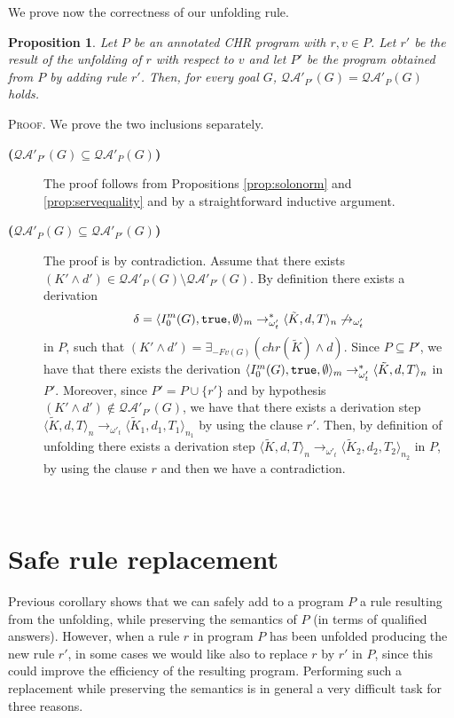 \documentclass[final]{acmtrans2e}
\newtheorem{proposition}[theorem]{Proposition}
\begin{document}
We prove now the correctness of our unfolding rule.

\begin{proposition}\label{lemma:equality}
Let $P$ be an annotated CHR program with $r, v\in P$. Let $r'$  be the result
of the unfolding of $r$ with respect to $v$ and let $P'$ be the program
obtained from $P$ by adding rule $r'$. Then, for every goal $G$,
$\mathcal{QA'}_{P'}(G) = \mathcal{QA'}_P(G)$ holds.
\end{proposition}


\textsc{Proof.}
We prove the two inclusions separately.
\begin{description}
  \item[{\bf ($\mathcal{QA'}_{P'}(G) \subseteq \mathcal{QA'}_P(G)$)}] The proof follows from Propositions \ref{prop:solonorm} and \ref{prop:servequality} and by a straightforward inductive argument.
  \item[{\bf ($\mathcal{QA'}_{P}(G) \subseteq \mathcal{QA'}_{P'}(G)$)}]
  The proof is by contradiction. Assume that there exists $(K'\wedge d') \in \mathcal{QA'}_{P}(G) \setminus \mathcal{QA'}_{P'}(G)$. By definition there exists a derivation
  \[\delta=\langle I_0^m (G),
{\tt true}, \emptyset\rangle_m\rightarrow^{*}_{\omega'_t}
\langle \tilde K, d, T\rangle_n\not\rightarrow_{\omega'_t}\] in $P$, such that $(K'\wedge d') =
\exists _{-Fv(G)}(chr( \tilde K)\wedge d)$. Since $P \subseteq P'$, we have that there exists the derivation
$\langle I_0^m (G),
{\tt true}, \emptyset\rangle_m\rightarrow^{*}_{\omega'_t}
\langle \tilde K, d, T\rangle_n$ in $P'$. Moreover, since $P' =P \cup \{r'\}$ and by hypothesis $(K'\wedge d')\not  \in \mathcal{QA'}_{P'}(G)$, we have that there exists a derivation step $\langle \tilde K, d, T\rangle_n\rightarrow_{\omega'_t}
\langle \tilde K_1, d_1, T_1\rangle_{n_1}$ by using the clause $r'$.
Then, by definition of unfolding there exists a derivation step $\langle \tilde K, d, T\rangle_n\rightarrow_{\omega'_t}
\langle \tilde K_2, d_2, T_2\rangle_{n_2}$ in $P$, by using the clause $r$ and then we have a contradiction.
\end{description}

\noindent{$\Box$}\\
	

\section{Safe rule replacement}\label{sec:safty-rule-deletion}
Previous corollary shows that we can safely add to a program $P$
a rule resulting from the unfolding, while preserving the
semantics of  $P$ (in terms of qualified answers).
However, when a rule $r$ in program $P$ has been unfolded producing
the new rule $r'$, in some cases we would like also to replace $r$ by $r'$ in $P$,
since this could improve the efficiency of the resulting program.
Performing such a replacement while preserving the semantics
is in general a very difficult task for three reasons.
\end{document}
